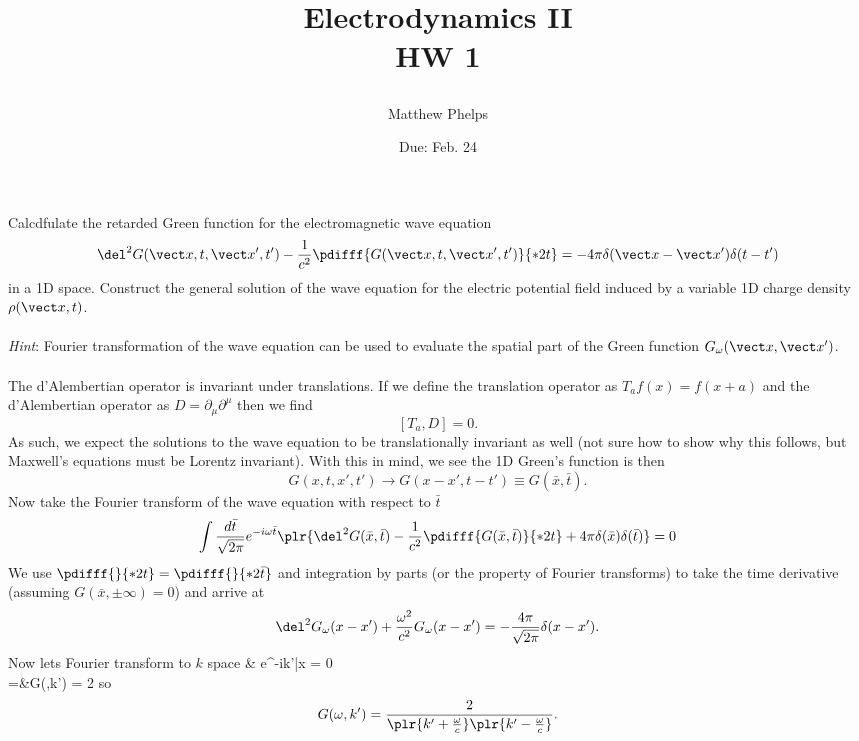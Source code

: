 \documentclass[10pt,letterpaper]{article}
\title{\begin{spacing}{1.2}Electrodynamics II\\HW 1\end{spacing}}
\author{Matthew Phelps}
\date{Due: Feb. 24}
\begin{document}
\maketitle

\benum
  	 \item
	Calcdfulate the retarded Green function for the electromagnetic wave equation
	\[
		\del^2G(\vect x,t,\vect x',t') - \frac{1}{c^2} \pdifff{G(\vect x,t,\vect x',t')}{*2t} = 
		-4\pi\delta(\vect x-\vect x')\delta(t-t')
	\]
	in a 1D space. Construct the general solution of the wave equation for the electric potential
	field induced by a variable 1D charge density $\rho(\vect x,t)$.
	\\ \\
	\emph{Hint}: Fourier transformation of the wave equation can be used to evaluate the spatial part of the 
	Green function $G_\omega(\vect x,\vect x')$. 
	\\ \\ 	
	The d'Alembertian operator is invariant under translations. If we define the translation operator 
	as $T_a f(x) = f(x+a)$ and the d'Alembertian operator as $D = \partial_\mu\partial^\mu$ then we find
	\[
		[T_a,D] = 0.
	\]
	As such, we expect the solutions to the wave equation to be translationally invariant as well (not sure how to show why 		this follows, but Maxwell's equations must be Lorentz invariant). With this in mind, we see the 1D Green's function is then
	\[
		G(x,t,x',t') \to G(x-x',t-t') \equiv G(\bar x,\bar t).
	\]
	Now take the Fourier transform of the wave equation with respect to $\bar t$
	\[
		\int \frac{d\bar t}{\sqrt{2\pi}} e^{-i\omega \bar t}
		\plr{ \del^2G(\bar x,\bar t) - \frac{1}{c^2} \pdifff{G(\bar x,\bar t)}{*2t}+ 
		4\pi\delta(\bar x)\delta(\bar t) }=0
	\]
	We use $\pdifff{}{*2t}= \pdifff{}{*2\bar t}$ and integration by parts (or the property of Fourier transforms) to 
	take the time derivative (assuming $G(\bar x,\pm \infty) = 0$) and arrive at
	\[
		\del^2 G_\omega(x-x')+\frac{\omega^2}{c^2} G_\omega(x-x')=- \frac{4\pi}{\sqrt{2\pi}}\delta(x-x').
	\]
	Now lets Fourier transform to $k$ space
	\ba
		&\int {} e^{-ik'\bar x} = 0\\
		=&G(\omega,k') = 2
	\ea
	so
	\[
		G(\omega, k') = \frac{2}{\plr{k'+\frac{\omega}{c}}\plr{k'-\frac{\omega}{c}}}.
	\]
\end{document}
